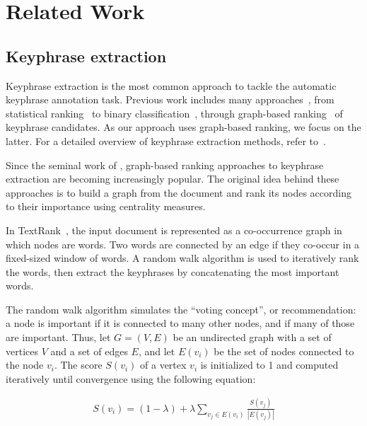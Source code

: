 \section{Related Work}
\label{sec:related_work}
    \subsection{Keyphrase extraction}
    \label{subsec:ake}
        Keyphrase extraction is the most common approach to tackle the automatic keyphrase annotation task. Previous work includes many approaches~\cite{hasan2014state_of_the_art}, from statistical ranking~\cite{salton1975tfidf} to  binary classification~\cite{witten1999kea}, through graph-based ranking~\cite{mihalcea2004textrank} of keyphrase candidates.
        As our approach uses graph-based ranking, we focus on the latter. For a detailed overview of
    keyphrase extraction methods, refer to~\cite{hassan2010conundrums,hasan2014state_of_the_art}.
    
        Since the seminal work of , graph-based ranking approaches to keyphrase extraction are becoming increasingly popular.
        The original idea behind these approaches is to build a graph from the document and rank its nodes according to their importance using centrality measures.
    
        In TextRank~\cite{mihalcea2004textrank}, the input document is represented as
    a co-occurrence graph in which nodes are words.
    Two words are connected by an edge if they co-occur in a fixed-sized window of words.
    A random walk algorithm is used to iteratively rank the words, then extract the
    keyphrases by concatenating the most important words. 
        
        
        The random walk algorithm simulates the ``voting concept'', or recommendation: a node is 
    important if it is connected to many other nodes, and if many of those are 
    important.
        Thus, let $G=(V,E)$ be an undirected graph with a set of vertices $V$ and a  set of edges $E$, and let $E(v_i)$ be the set of nodes connected to the node $v_i$.
        The score $S(v_i)$ of a vertex $v_i$ is initialized to 1 and computed iteratively until convergence using the following equation:
        
        \begin{align}
          S(v_i) = (1 - \lambda) + \lambda \sum_{v_j \in E(v_i)}{\frac{S(v_j)}{|E(v_j)|}}
        \end{align}
        
